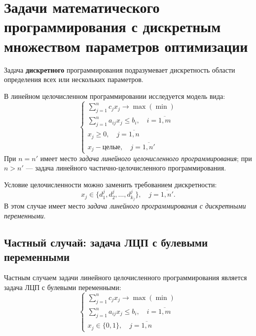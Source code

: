\documentclass[17pt]{extarticle}
\begin{document}
\section{Задачи математического программирования с дискретным множеством параметров оптимизации}

Задача \textbf{дискретного} программирования подразумевает дискретность области определения всех или нескольких параметров.

В линейном целочисленном программировании исследуется модель вида:
\[
    \begin{cases}
        \sum\limits_{j=1}^{n} c_j x_j \to \max (\min)                        \\
        \sum\limits_{j=1}^{n} a_{ij} x_{j} \le b_i, \quad i = \overline{1,m} \\
        x_j \ge 0, \quad j = \overline{1,n}                                  \\
        x_j - \text{целые}, \quad j = \overline{1,n'}
    \end{cases}
\]
При \( n = n' \) имеет место \textit{задача линейного целочисленного программирования}; при \( n > n' \) — задача линейного частично-целочисленного программирования.

Условие целочисленности можно заменить требованием дискретности:
\[
    x_j \in \{ d_1^j, d_2^j, \dots, d_{k_j}^j \}, \quad j = \overline{1, n'}.
\]
В этом случае имеет место \textit{задача линейного программирования с дискретными переменными}.

\subsection{Частный случай: задача ЛЦП с булевыми переменными}
Частным случаем задачи линейного целочисленного программирования является задача ЛЦП с булевыми переменными:
\[
    \begin{cases}
        \sum\limits_{j=1}^{n} c_j x_j \to \max (\min)                        \\
        \sum\limits_{j=1}^{n} a_{ij} x_{j} \le b_i, \quad i = \overline{1,m} \\
        x_j \in \{0,1\}, \quad j = \overline{1,n}
    \end{cases}
\]
\end{document}
